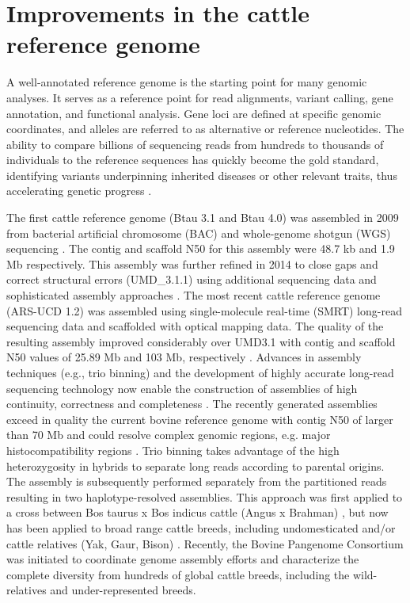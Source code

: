 \documentclass[../main.tex]{subfiles}
\begin{document}
\section{Improvements in the cattle reference genome} 

A well-annotated reference genome is the starting point for many genomic analyses. It serves as a reference point for read alignments, variant calling, gene annotation, and functional analysis. Gene loci are defined at specific genomic coordinates, and alleles are referred to as alternative or reference  nucleotides. The ability to compare billions of sequencing reads from hundreds to thousands of individuals to the reference sequences has quickly become the gold standard, identifying variants underpinning  inherited diseases or other relevant traits, thus accelerating genetic progress \citep{bickhart2020symposium}.

The first cattle reference genome (Btau 3.1 and Btau 4.0) was assembled in 2009 from bacterial artificial chromosome (BAC) and whole-genome shotgun (WGS) sequencing \citep{elsik2009genome}. The contig and scaffold N50 for this assembly were 48.7 kb and 1.9 Mb respectively. This assembly was further refined in 2014 to close gaps and correct structural errors (UMD\_3.1.1) using additional sequencing data and sophisticated assembly approaches \citep{zimin2009whole}. The most recent cattle reference genome (ARS-UCD 1.2) was assembled using single-molecule real-time (SMRT) long-read sequencing data and scaffolded with optical mapping data. The quality of the resulting assembly improved considerably over UMD3.1 with contig and scaffold N50 values of 25.89 Mb and 103 Mb, respectively \citep{rosen2020novo}. Advances in assembly techniques (e.g., trio binning) and the development of highly accurate long-read sequencing technology now enable the construction of assemblies of high continuity, correctness and completeness \citep{bickhart2020symposium}. The recently generated assemblies exceed in quality the current bovine reference genome with contig N50 of larger than 70 Mb and could resolve complex genomic regions, e.g. major histocompatibility regions \citep{rice2020continuous}. Trio binning takes advantage of the high heterozygosity in hybrids to separate long reads according to parental origins. The assembly is subsequently performed separately from the partitioned reads resulting in two haplotype-resolved assemblies. This approach  was first applied  to a cross between Bos taurus x Bos indicus cattle (Angus x Brahman) \citep{koren2018novo}, but now has been applied to broad range cattle breeds, including  undomesticated and/or cattle relatives (Yak, Gaur, Bison) \citep{oppenheimer2021reference}. Recently, the Bovine Pangenome Consortium \citep{heaton2021reference} was initiated to coordinate genome assembly efforts and characterize the complete diversity from hundreds of global cattle breeds, including the wild-relatives and under-represented breeds. 
\end{document}

